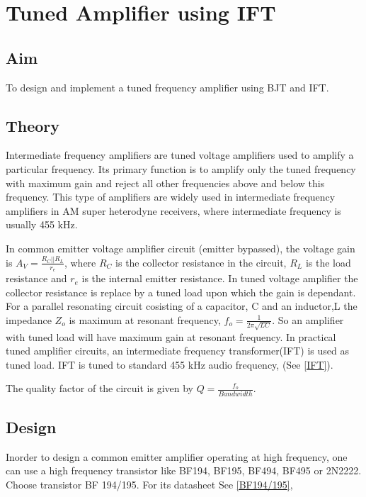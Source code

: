 \chapter[Tuned Amplifier using IFT]{Tuned Amplifier using IFT}
\label{iftamplifier}
\section*{Aim}
To design and implement a tuned frequency amplifier using BJT and IFT.
\section*{Theory}


Intermediate frequency amplifiers are tuned voltage amplifiers used to amplify a particular frequency. Its primary function is to amplify only the tuned frequency with maximum gain and reject all other frequencies above and below this frequency. This type of amplifiers are widely used in intermediate frequency amplifiers in AM super heterodyne receivers, where intermediate frequency is usually 455 kHz.

In common emitter voltage amplifier circuit (emitter bypassed), the voltage gain is $A_V=\frac{R_C||R_L}{r_e}$, where $R_C$ is the collector resistance in the circuit, $R_L$ is the load resistance and $r_e$ is the internal emitter resistance. In tuned voltage amplifier the collector resistance is replace by a tuned load upon which  the gain is dependant. For a parallel resonating circuit cosisting of a capacitor, C and an inductor,L the impedance $Z_o$ is maximum at resonant frequency, $f_o=\frac{1}{2\pi \sqrt{LC}}$. So an amplifier with tuned load will have maximum gain at resonant frequency.
In practical tuned amplifier circuits, an intermediate frequency transformer(IFT) is used as tuned load. IFT is tuned to standard 455 kHz audio frequency, (See \ref{IFT}).

The quality factor of the circuit is given by $Q=\frac{f_o}{Bandwidth}$.

\section*{Design}
Inorder to design a common emitter amplifier operating at high frequency, one can use a high frequency transistor like BF194, BF195, BF494, BF495 or 2N2222.
\\Choose transistor BF 194/195. For its datasheet See \ref{BF194/195},\\


